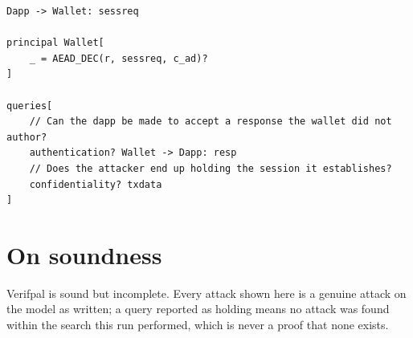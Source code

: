 \documentclass[11pt]{article}
\begin{document}
\begin{lstlisting}
Dapp -> Wallet: sessreq

principal Wallet[
	_ = AEAD_DEC(r, sessreq, c_ad)?
]

queries[
	// Can the dapp be made to accept a response the wallet did not author?
	authentication? Wallet -> Dapp: resp
	// Does the attacker end up holding the session it establishes?
	confidentiality? txdata
]
\end{lstlisting}


\section{On soundness}
\noindent Verifpal is sound but incomplete. Every attack shown here is a genuine attack on the model as written; a query reported as holding means no attack was found within the search this run performed, which is never a proof that none exists.
\end{document}
